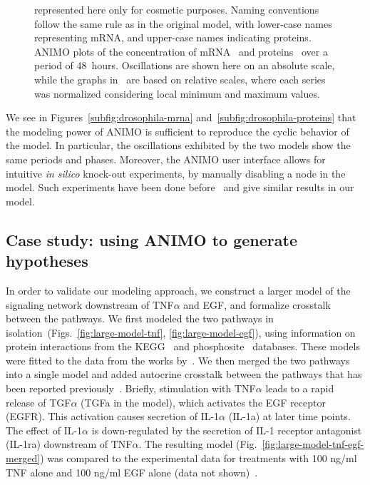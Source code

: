 \begin{figure}[!htpb]
{represented here only for cosmetic purposes. Naming conventions follow the same rule
as in the original model, with lower-case names representing mRNA, and upper-case names indicating proteins.\\
ANIMO plots of the concentration of
mRNA~{\bfseries \protect{}}
and proteins~{\bfseries \protect{}} over a period of 48~hours.
Oscillations are shown here on an absolute scale, while the graphs in~\citep{drosophila-ode-model}
are based on relative scales, where each series was normalized considering
local minimum and maximum values.}\label{fig:drosophila}
\end{figure}


We see in Figures~\ref{subfig:drosophila-mrna} and~\ref{subfig:drosophila-proteins} that the modeling
power of ANIMO is sufficient to reproduce the cyclic behavior of the model.
In particular, the oscillations exhibited by the two models show the same periods and phases.
Moreover, the ANIMO user interface allows for intuitive \emph{in silico} knock-out experiments,
by manually disabling a node in the model. Such experiments have been done before~\citep{drosophila-ode-model} and
give similar results in our model.



\subsection{Case study: using ANIMO to generate hypotheses}\label{subsec:case-study-larger}
In order to validate our modeling approach,
we construct a larger model of the signaling network downstream of TNF$\alpha$ and EGF, and formalize crosstalk between the pathways.
 We first modeled the two pathways in isolation~(Figs.~\ref{fig:large-model-tnf}, \ref{fig:large-model-egf}),
using information on protein interactions from
the KEGG~\citep{kegg} and phosphosite~\citep{phosphosite} databases. These models were fitted to the data
from the works by~\citet{pathway-compendium,pathway-autocrine}.
We then merged the two pathways into a single model and added autocrine crosstalk between the pathways that has been
reported previously~\citep{pathway-autocrine}.
Briefly, stimulation with TNF$\alpha$ leads to a rapid release of TGF$\alpha$ ({\sf TGFa} in the model), which activates the EGF receptor ({\sf EGFR}).
This activation causes secretion of IL-1$\alpha$ ({\sf IL-1a}) at later time points.
The effect of IL-1$\alpha$ is down-regulated by the secretion of IL-1 receptor antagonist ({\sf IL-1ra}) downstream of TNF$\alpha$.
The resulting model (Fig.~\ref{fig:large-model-tnf-egf-merged}) was compared to the experimental data for treatments with 100 ng/ml TNF alone
and 100 ng/ml EGF alone (data not shown)~\citep{pathway-compendium}.

